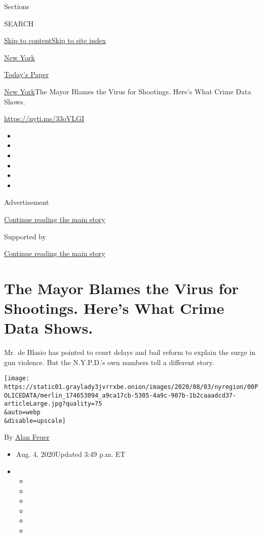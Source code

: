 Sections

SEARCH

\protect\hyperlink{site-content}{Skip to
content}\protect\hyperlink{site-index}{Skip to site index}

\href{https://www.nytimes3xbfgragh.onion/section/nyregion}{New York}

\href{https://myaccount.nytimes3xbfgragh.onion/auth/login?response_type=cookie\&client_id=vi}{}

\href{https://www.nytimes3xbfgragh.onion/section/todayspaper}{Today's
Paper}

\href{/section/nyregion}{New York}\textbar{}The Mayor Blames the Virus
for Shootings. Here's What Crime Data Shows.

\url{https://nyti.ms/33oVLGI}

\begin{itemize}
\item
\item
\item
\item
\item
\item
\end{itemize}

Advertisement

\protect\hyperlink{after-top}{Continue reading the main story}

Supported by

\protect\hyperlink{after-sponsor}{Continue reading the main story}

\hypertarget{the-mayor-blames-the-virus-for-shootings-heres-what-crime-data-shows}{%
\section{The Mayor Blames the Virus for Shootings. Here's What Crime
Data
Shows.}\label{the-mayor-blames-the-virus-for-shootings-heres-what-crime-data-shows}}

Mr. de Blasio has pointed to court delays and bail reform to explain the
surge in gun violence. But the N.Y.P.D.'s own numbers tell a different
story.

\texttt{[image: https://static01.graylady3jvrrxbe.onion/images/2020/08/03/nyregion/00POLICEDATA/merlin\_174653094\_a9ca17cb-5305-4a9c-907b-1b2caaadcd37-articleLarge.jpg?quality=75\\\&auto=webp\\\&disable=upscale]}

By \href{https://www.nytimes3xbfgragh.onion/by/alan-feuer}{Alan Feuer}

\begin{itemize}
\item
  Aug. 4, 2020Updated 3:49 p.m. ET
\item
  \begin{itemize}
  \item
  \item
  \item
  \item
  \item
  \item
  \end{itemize}
\end{itemize}

